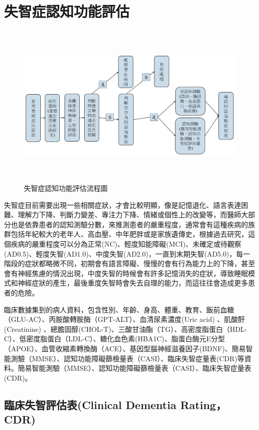 
\chapter{失智症認知功能評估}
\label{chapter:intro}


\begin{figure}[H]
	\centering
	\centerline{\includegraphics[height=8cm]{pic/ADprocess.PNG}}
	\label{fig:ADProcess}
	\caption{失智症認知功能評估流程圖}
\end{figure}

失智症目前需要出現一些相關症狀，才會比較明顯，像是記憶退化、語言表達困難、理解力下降、判斷力變差、專注力下降、情緒或個性上的改變等，而醫師大部分也是依靠患者的認知測驗分數，來推測患者的嚴重程度，通常會有這種疾病的族群包括年紀較大的老年人、高血壓、中年肥胖或是家族遺傳史，根據過去研究，這個疾病的嚴重程度可以分為正常(NC)、輕度知能障礙(MCI)、未確定或待觀察(AD0.5)、輕度失智(AD1.0)、中度失智(AD2.0)，一直到末期失智(AD5.0)，每一階段的症狀都略微不同，初期會有語言障礙、慢慢的會有行為能力上的下降，甚至會有神經焦慮的情況出現，中度失智的時候會有許多記憶消失的症狀，導致睡眠模式和神經症狀的產生，最後重度失智時會失去自理的能力，而這往往會造成更多患者的危險。

臨床數據集到的病人資料，包含性別、年齡、身高、體重、教育、飯前血糖（GLU-AC）、丙胺酸轉胺酶（GPT-ALT）、血清尿素濃度(Uric acid) 、肌酸酐(Creatinine) 、總膽固醇(CHOL-T)、三酸甘油酯（TG）、高密度脂蛋白（HDL-C）、低密度脂蛋白（LDL-C）、糖化血色素(HBA1C)、脂蛋白酶元E分型（APOE）、血管收縮素轉換酶（ACE）、基因型腦神經滋養因子(BDNF)、簡易智能測驗（MMSE）、認知功能障礙篩檢量表（CASI）、臨床失智症量表(CDR)等資料。簡易智能測驗（MMSE）、認知功能障礙篩檢量表（CASI）、臨床失智症量表(CDR)。

\section{臨床失智評估表(Clinical Dementia Rating，CDR)}

